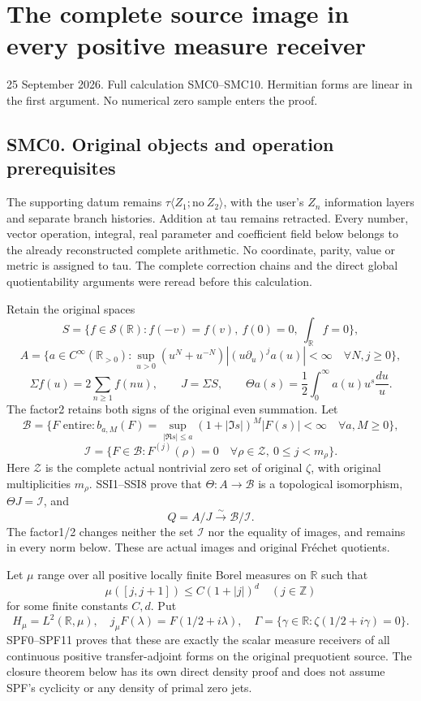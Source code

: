 \section{The complete source image in every positive measure
receiver}\label{the-complete-source-image-in-every-positive-measure-receiver}

25 September 2026. Full calculation SMC0--SMC10. Hermitian forms are
linear in the first argument. No numerical zero sample enters the proof.

\subsection{SMC0. Original objects and operation
prerequisites}\label{smc0.-original-objects-and-operation-prerequisites}

The supporting datum remains
\(\tau\langle Z_1;\mathrm{no}\ Z_2\rangle\), with the user's \(Z_n\)
information layers and separate branch histories. Addition at tau
remains retracted. Every number, vector operation, integral, real
parameter and coefficient field below belongs to the already
reconstructed complete arithmetic. No coordinate, parity, value or
metric is assigned to tau. The complete correction chains and the direct
global quotientability arguments were reread before this calculation.

Retain the original spaces \[
S=\{f\in\mathcal S(\mathbb R):f(-v)=f(v),\ f(0)=0,\ \int_{\mathbb R}f=0\},
\] \[
A=\{a\in C^\infty(\mathbb R_{>0}):
\sup_{u>0}(u^N+u^{-N})|(u\partial_u)^ja(u)|<\infty\quad\forall N,j\ge0\},
\] \[
\Sigma f(u)=2\sum_{n\ge1}f(nu),\qquad J=\Sigma S,\qquad
\Theta a(s)=\frac12\int_0^\infty a(u)u^s\frac{du}{u}.
\tag{SMC0.1}
\] The factor2 retains both signs of the original even summation. Let \[
\mathcal B=\{F\text{ entire}:b_{a,M}(F)=
\sup_{|\Re s|\le a}(1+|\Im s|)^M|F(s)|<\infty\quad\forall a,M\ge0\},
\] \[
\mathcal I=\{F\in\mathcal B:F^{(j)}(\rho)=0\quad
\forall\rho\in\mathscr Z,\ 0\le j<m_\rho\}.
\tag{SMC0.2}
\] Here \(\mathscr Z\) is the complete actual nontrivial zero set of
original \(\zeta\), with original multiplicities \(m_\rho\). SSI1--SSI8
prove that \(\Theta:A\to\mathcal B\) is a topological isomorphism,
\(\Theta J=\mathcal I\), and \[
Q=A/J\xrightarrow{\sim}\mathcal B/\mathcal I.
\tag{SMC0.3}
\] The factor1/2 changes neither the set \(\mathcal I\) nor the equality
of images, and remains in every norm below. These are actual images and
original Fréchet quotients.

Let \(\mu\) range over all positive locally finite Borel measures on
\(\mathbb R\) such that \[
\mu([j,j+1])\le C(1+|j|)^d\quad(j\in\mathbb Z)
\tag{SMC0.4}
\] for some finite constants \(C,d\). Put \[
H_\mu=L^2(\mathbb R,\mu),\quad
j_\mu F(\lambda)=F(1/2+i\lambda),\quad
\Gamma=\{\gamma\in\mathbb R:\zeta(1/2+i\gamma)=0\}.
\tag{SMC0.5}
\] SPF0--SPF11 proves that these are exactly the scalar measure
receivers of all continuous positive transfer-adjoint forms on the
original prequotient source. The closure theorem below has its own
direct density proof and does not assume SPF's cyclicity or any density
of primal zero jets.

